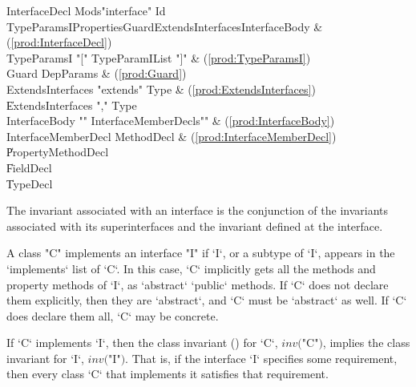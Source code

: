 \begin{bbgrammar}
       InterfaceDecl \: Mods\opt \xcd"interface" Id TypeParamsI\opt Properties\opt Guard\opt ExtendsInterfaces\opt InterfaceBody & (\ref{prod:InterfaceDecl}) \\
         TypeParamsI \: \xcd"[" TypeParamIList \xcd"]" & (\ref{prod:TypeParamsI}) \\
               Guard \: DepParams & (\ref{prod:Guard}) \\
   ExtendsInterfaces \: \xcd"extends" Type & (\ref{prod:ExtendsInterfaces}) \\
                     \| ExtendsInterfaces \xcd"," Type \\
       InterfaceBody \: \xcd"{" InterfaceMemberDecls\opt \xcd"}" & (\ref{prod:InterfaceBody}) \\
 InterfaceMemberDecl \: MethodDecl & (\ref{prod:InterfaceMemberDecl}) \\
                     \| PropertyMethodDecl \\
                     \| FieldDecl \\
                     \| TypeDecl \\
\end{bbgrammar}


\noindent
The invariant associated with an interface is the conjunction of the
invariants associated with its superinterfaces and the invariant
defined at the interface. 



A class \xcd"C"  implements an interface \xcd"I" if \xcd`I`, or a subtype of \xcd`I`, appears in the \xcd`implements` list
of \xcd`C`.  
In this case,
 \xcd`C` implicitly gets all the methods and property methods of \xcd`I`,
      as \xcd`abstract` \xcd`public` methods.  If \xcd`C` does not declare
      them explicitly, then they are \xcd`abstract`, and \xcd`C` must be
      \xcd`abstract` as well.   If \xcd`C` does declare them all, \xcd`C` may
      be concrete.



If \xcd`C` implements \xcd`I`, then the class invariant
() for \xcd`C`,   $\mathit{inv}($\xcd"C"$)$, implies
the class invariant for \xcd`I`, $\mathit{inv}($\xcd"I"$)$.  That is, if the
interface \xcd`I` specifies some requirement, then every class \xcd`C` that
implements it satisfies that requirement.

